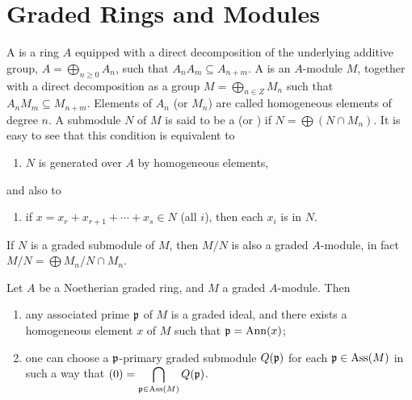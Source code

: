\documentclass[../main]{subfiles}
\begin{document}
\section{Graded Rings and Modules}\label{sec:10}

\newparagraph A  is a ring $A$ equipped with a direct decomposition of the underlying additive group, $A=\bigoplus_{n\geqslant0}A_n$, such that $A_nA_m\subseteq A_{n+m}$. A  is an $A$-module $M$, together with a direct decomposition as a group $M=\bigoplus_{n\in Z}M_n$ such that $A_nM_m\subseteq M_{n+m}$. Elements of $A_n$ (or $M_n$) are called homogeneous elements of degree $n$. A submodule $N$ of $M$ is said to be a  (or )  if $N = \bigoplus(N\cap M_n)$. It is easy to see that this condition is equivalent to 
\begin{enumerate}[label = (10.$*$), ref = cond:10.$*$]
    \item $N$ is generated over $A$ by homogeneous elements, 
\end{enumerate}
and also to 
\begin{enumerate}[label = (10.$**$), ref = cond:10.$**$]
    \item if $x = x_r + x_{r+1}+\cdots+x_s\in N$ (all $i$), then each $x_i$ is in $N$. 
\end{enumerate}

If $N$ is a graded submodule of $M$, then $M/N$ is also a graded $A$-module, in fact $M/N=\bigoplus M_n/N\cap M_n$.

\begin{parproposition}
Let $A$ be a Noetherian graded ring, and $M$ a graded $A$-module. Then
\begin{enumerate}[label=\roman*)]
    \item any associated prime $\mathfrak{p}$ of $M$ is a graded ideal, and there exists a homogeneous element $x$ of $M$ such that $\mathfrak{p}=\operatorname{Ann}(x)$;
    \item one can choose a $\mathfrak{p}$-primary graded submodule $Q(\mathfrak{p})$ for each $\mathfrak{p} \in \operatorname{Ass} (M)$ in such a way that $(0)=\displaystyle\bigcap_{\mathfrak{p} \in \operatorname{Ass}(M)} Q(\mathfrak{p})$.
\end{enumerate}
\end{parproposition}
\end{document}
